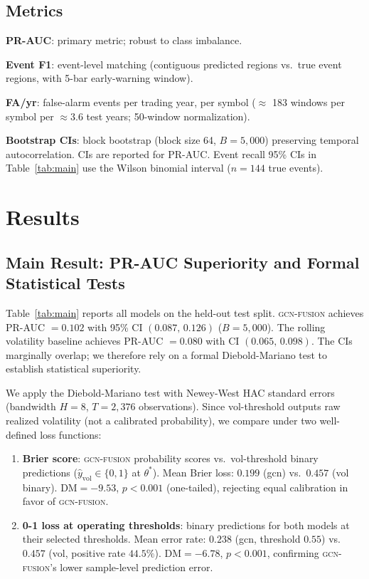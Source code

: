 \documentclass[sigconf]{acmart}
\begin{document}
\subsection{Metrics}
\label{sec:metrics}

\textbf{PR-AUC}: primary metric; robust to class imbalance.

\textbf{Event F1}: event-level matching (contiguous predicted regions vs.\
true event regions, with 5-bar early-warning window).

\textbf{FA/yr}: false-alarm events per trading year, per symbol ($\approx$
183 windows per symbol per $\approx$3.6 test years; 50-window normalization).

\textbf{Bootstrap CIs}: block bootstrap (block size 64, $B{=}5{,}000$)
preserving temporal autocorrelation. CIs are reported for PR-AUC.
Event recall 95\% CIs in Table~\ref{tab:main} use the Wilson binomial
interval ($n{=}144$ true events).

\section{Results}
\label{sec:results}

\subsection{Main Result: PR-AUC Superiority and Formal Statistical Tests}

Table~\ref{tab:main} reports all models on the held-out test split.
\textsc{gcn-fusion} achieves PR-AUC $= 0.102$ with 95\% CI $(0.087,\, 0.126)$
($B{=}5{,}000$). The rolling volatility baseline achieves PR-AUC $= 0.080$
with CI $(0.065,\, 0.098)$. The CIs marginally overlap; we therefore rely on
a formal Diebold-Mariano test to establish statistical superiority.

We apply the Diebold-Mariano test \cite{diebold1995} with
Newey-West HAC standard errors (bandwidth $H{=}8$, $T{=}2{,}376$
observations). Since vol-threshold outputs raw realized volatility (not a
calibrated probability), we compare under two well-defined loss functions:

\begin{enumerate}
\item \textbf{Brier score}: \textsc{gcn-fusion} probability scores vs.\
vol-threshold binary predictions ($\hat{y}_\mathrm{vol} \in \{0,1\}$ at
$\theta^*$). Mean Brier loss: $0.199$ (gcn) vs.\ $0.457$ (vol binary).
$\mathrm{DM} = -9.53$, $p{<}0.001$ (one-tailed), rejecting equal calibration
in favor of \textsc{gcn-fusion}.

\item \textbf{0-1 loss at operating thresholds}: binary predictions for both
models at their selected thresholds. Mean error rate: $0.238$ (gcn, threshold
$0.55$) vs.\ $0.457$ (vol, positive rate $44.5\%$). $\mathrm{DM} = -6.78$,
$p{<}0.001$, confirming \textsc{gcn-fusion}'s lower sample-level prediction
error.
\end{enumerate}
\end{document}
